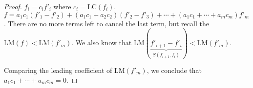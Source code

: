 \documentclass[a4paper,twoside,master.tex]{subfiles}
\begin{document}
\begin{proof}
    $ f_i = c_i f'_i $ where $ c_i = \text{LC}(f_i) $. $ f = a_1 c_1(f'_1 - f'_2) + (a_1 c_1 + a_2 c_2)(f'_2 - f'_3) + \cdots + (a_1 c_1 + \cdots + a_m c_m) f'_m $. There are no more terms left to cancel the last term, but recall the $ \text{LM}(f) < \text{LM}(f'_m) $. We also know that $ \text{LM}(\underbrace{f'_{i+1} - f'_i}_{S(f_{i+1}, f_{i})}) < \text{LM}(f'_m) $.

    Comparing the leading coefficient of $ \text{LM}(f'_m) $, we conclude that $ a_1 c_1 + \cdots + a_m c_m = 0 $.
\end{proof}
\end{document}
